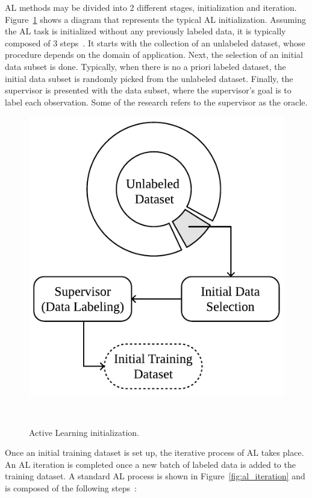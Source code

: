 \documentclass[parskip=full]{scrartcl}
\begin{document}
AL methods may be divided into 2 different stages, initialization and
iteration. Figure~\ref{fig:al_initialization} shows a diagram that represents
the typical AL initialization. Assuming the AL task is initialized without any
previously labeled data, it is typically composed of 3
steps~\cite{Fonseca2021}. It starts with the collection of an unlabeled
dataset, whose procedure depends on the domain of application. Next, the
selection of an initial data subset is done. Typically, when there is no a
priori labeled dataset, the initial data subset is randomly picked from the
unlabeled dataset. Finally, the supervisor is presented with the data subset,
where the supervisor's goal is to label each observation. Some of the research
refers to the supervisor as the oracle.

\begin{figure}[H]
	\centering
	\includegraphics[width=.4\linewidth]{../analysis/al_initialization}
    \caption{%
        Active Learning initialization.
    }~\label{fig:al_initialization}
\end{figure}

Once an initial training dataset is set up, the iterative process of AL takes
place. An AL iteration is completed once a new batch of labeled data is added
to the training dataset. A standard AL process is shown in
Figure~\ref{fig:al_iteration} and is composed of the following
steps~\cite{Su2020, Sverchkov2017}:
\end{document}
